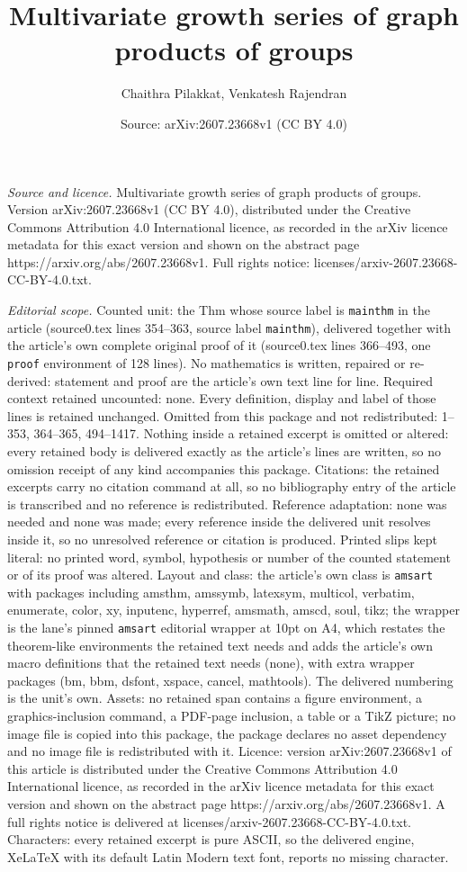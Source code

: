 \documentclass[10pt,a4paper]{amsart}
\title[Multivariate growth series of graph products of groups]{Multivariate growth series of graph products of groups}
\author{Chaithra Pilakkat, Venkatesh Rajendran}
\date{Source: arXiv:2607.23668v1 (CC BY 4.0)}
\begin{document}
\maketitle

\noindent\emph{Source and licence.} Multivariate growth series of graph products of groups. Version arXiv:2607.23668v1 (CC BY 4.0), distributed under the Creative Commons Attribution 4.0 International licence, as recorded in the arXiv licence metadata for this exact version and shown on the abstract page https://arxiv.org/abs/2607.23668v1. Full rights notice: licenses/arxiv-2607.23668-CC-BY-4.0.txt.\par\smallskip

\noindent\textit{Editorial scope.} Counted unit: the Thm whose source label is \texttt{mainthm} in the article (source0.tex lines 354--363, source label \texttt{mainthm}), delivered together with the article's own complete original proof of it (source0.tex lines 366--493, one \texttt{proof} environment of 128 lines). No mathematics is written, repaired or re-derived: statement and proof are the article's own text line for line. Required context retained uncounted: none. Every definition, display and label of those lines is retained unchanged. Omitted from this package and not redistributed: 1--353, 364--365, 494--1417. Nothing inside a retained excerpt is omitted or altered: every retained body is delivered exactly as the article's lines are written, so no omission receipt of any kind accompanies this package. Citations: the retained excerpts carry no citation command at all, so no bibliography entry of the article is transcribed and no reference is redistributed. Reference adaptation: none was needed and none was made; every reference inside the delivered unit resolves inside it, so no unresolved reference or citation is produced. Printed slips kept literal: no printed word, symbol, hypothesis or number of the counted statement or of its proof was altered. Layout and class: the article's own class is \texttt{amsart} with packages including amsthm, amssymb, latexsym, multicol, verbatim, enumerate, color, xy, inputenc, hyperref, amsmath, amscd, soul, tikz; the wrapper is the lane's pinned \texttt{amsart} editorial wrapper at 10pt on A4, which restates the theorem-like environments the retained text needs and adds the article's own macro definitions that the retained text needs (none), with extra wrapper packages (bm, bbm, dsfont, xspace, cancel, mathtools). The delivered numbering is the unit's own. Assets: no retained span contains a figure environment, a graphics-inclusion command, a PDF-page inclusion, a table or a TikZ picture; no image file is copied into this package, the package declares no asset dependency and no image file is redistributed with it. Licence: version arXiv:2607.23668v1 of this article is distributed under the Creative Commons Attribution 4.0 International licence, as recorded in the arXiv licence metadata for this exact version and shown on the abstract page https://arxiv.org/abs/2607.23668v1. A full rights notice is delivered at licenses/arxiv-2607.23668-CC-BY-4.0.txt. Characters: every retained excerpt is pure ASCII, so the delivered engine, XeLaTeX with its default Latin Modern text font, reports no missing character.
\end{document}
